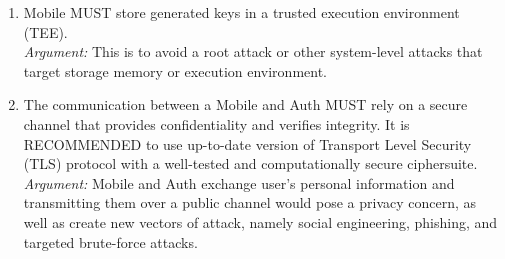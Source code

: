 \begin{enumerate}
        \item Mobile MUST store generated keys in a trusted execution environment (TEE).\\        
        \textit{Argument:} This is to avoid a root attack or other system-level attacks that target storage 
                           memory or execution environment.

        \item The communication between a Mobile and Auth MUST rely on a secure channel that provides 
              confidentiality and verifies integrity. It is RECOMMENDED to use up-to-date version of 
              Transport Level Security (TLS) protocol with a well-tested and computationally secure 
              ciphersuite.\\      
        \textit{Argument:} Mobile and Auth exchange user's personal information and transmitting them over a 
                           public channel would pose a privacy concern, as well as create new vectors of attack, 
                           namely social engineering, phishing, and targeted brute-force attacks.
    \end{enumerate}